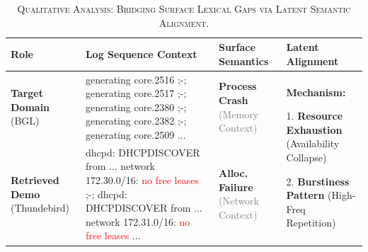 \documentclass[lettersize,journal]{IEEEtran}
\begin{document}
\begin{table}[t]
    \centering
    \small
    \renewcommand{\arraystretch}{1.2} 
    
    \renewcommand{\tabularxcolumn}[1]{m{#1}}
    
    \caption{\textsc{Qualitative Analysis: Bridging Surface Lexical Gaps via Latent Semantic Alignment.}} 
    \label{tab:case_study}
    
    \begin{tabularx}{\textwidth}{@{} 
        >{\centering\arraybackslash}m{2.5cm}   %
        >{\raggedright\arraybackslash}X        %
        >{\centering\arraybackslash}m{3cm}     %
        m{4.5cm}                               %
    @{}}
    \toprule
    \textbf{Role} & \textbf{Log Sequence Context} & \textbf{Surface Semantics} & \textbf{Latent Alignment} \\
    \midrule
    
    \textbf{Target Domain} (BGL) & 
    generating core.2516 ;-; generating core.2517 ;-; generating core.2380 ;-; generating core.2382 ;-; generating core.2509 ... & 
    \textbf{Process Crash} \newline \textcolor{gray}{(Memory Context)} & 
    
    \multirow{2}{=}{%
        \textbf{Mechanism:}\par
        1. \textbf{Resource Exhaustion}\newline
        {\color{gray}\footnotesize (Availability Collapse)}\par
        \vspace{0.5em}
        2. \textbf{Burstiness Pattern}\newline
        {\color{gray}\footnotesize (High-Freq Repetition)}
    } \\
    
    \cmidrule(r){1-3}
    
    \textbf{Retrieved Demo} (Thundebird) & 
    dhcpd: DHCPDISCOVER from ... network 172.30.0/16: \textcolor{red}{no free leases} ;-; dhcpd: DHCPDISCOVER from ... network 172.31.0/16: \textcolor{red}{no free leases} ... & 
    \textbf{Alloc. Failure} \newline \textcolor{gray}{(Network Context)} & 
    \\ 
    
    \bottomrule
    \end{tabularx}
\end{table}
\end{document}

